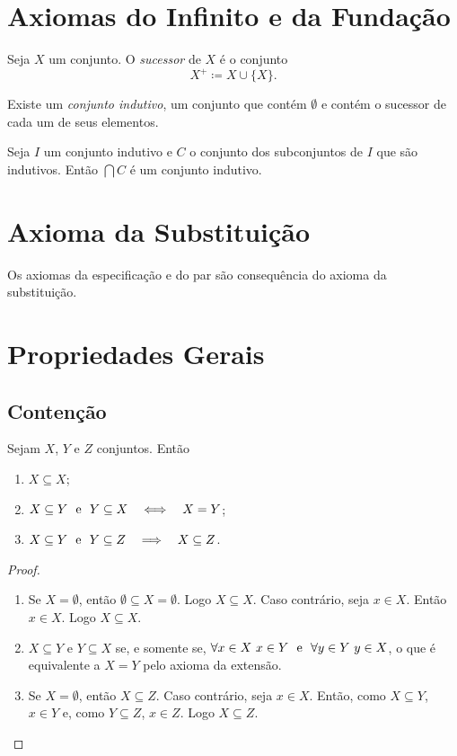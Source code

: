 \section{Axiomas do Infinito e da Fundação}

\begin{defi}
Seja $X$ um conjunto. O \emph{sucessor} de $X$ é o conjunto
	\begin{equation*}
	X^+ \coloneqq X \cup \{X\}.
	\end{equation*}
\end{defi}

\begin{axi}
Existe um \emph{conjunto indutivo}, um conjunto que contém $\emptyset$ e contém o sucessor de cada um de seus elementos.
\end{axi}

\begin{prop}
Seja $I$ um conjunto indutivo e $C$ o conjunto dos subconjuntos de $I$ que são indutivos. Então $\bigcap C$ é um conjunto indutivo.
\end{prop}

\section{Axioma da Substituição}

Os axiomas da especificação e do par são consequência do axioma da substituição.


\section*{Propriedades Gerais}

\subsection*{Contenção}

\begin{prop}
Sejam $X$, $Y$ e $Z$ conjuntos. Então
	\begin{enumerate}
	\item $X \subseteq X$;
	\item $X \subseteq Y \text{\ \ e\ \ } Y \subseteq X \quad \Longleftrightarrow \quad X=Y$;
	\item $X \subseteq Y \text{\ \ e\ \ } Y \subseteq Z \quad \Longrightarrow \quad X \subseteq Z$.
	\end{enumerate}
\end{prop}
\begin{proof}
	\begin{enumerate}
	\item Se $X=\emptyset$, então $\emptyset \subseteq X = \emptyset$. Logo $X \subseteq X$. Caso contrário, seja $x \in X$. Então $x \in X$. Logo $X \subseteq X$.
	\item $X \subseteq Y$ e $Y \subseteq X$ se, e somente se, $\forall x \in X \ x \in Y \text{\ \ e\ \ } \forall y \in Y \ y \in X$, o que é equivalente a $X=Y$ pelo axioma da extensão.
	\item Se $X=\emptyset$, então $X \subseteq Z$. Caso contrário, seja $x \in X$. Então, como $X \subseteq Y$, $x \in Y$ e, como $Y \subseteq Z$, $x \in Z$. Logo $X \subseteq Z$.
	\end{enumerate}
\end{proof}

